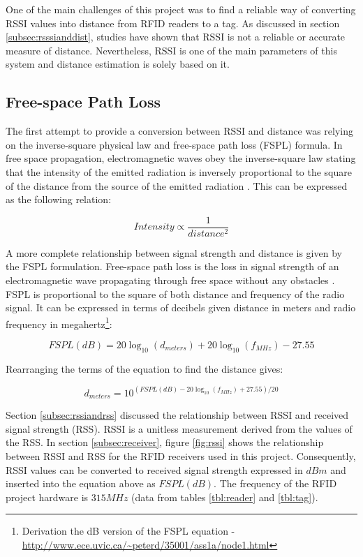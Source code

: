 One of the main challenges of this project was to find a reliable way of converting RSSI values into distance from RFID readers to a tag. As discussed in section \ref{subsec:rsssianddist}, studies have shown that RSSI is not a reliable or accurate measure of distance. Nevertheless, RSSI is one of the main parameters of this system and distance estimation is solely based on it.

\subsection{Free-space Path Loss}

The first attempt to provide a conversion between RSSI and distance was relying on the inverse-square physical law and free-space path loss (FSPL) formula. In free space propagation, electromagnetic waves obey the inverse-square law stating that the intensity of the emitted radiation is inversely proportional to the square of the distance from the source of the emitted radiation \cite[p. 19]{Schlaikjer1962}. This can be expressed as the following relation:

\[ Intensity \propto \frac{1}{distance^{2}} \]

A more complete relationship between signal strength and distance is given by the FSPL formulation. Free-space path loss is the loss in signal strength of an electromagnetic wave propagating through free space without any obstacles \cite{Balanis2012}. FSPL is proportional to the square of both distance and frequency of the radio signal. It can be expressed in terms of decibels given distance in meters and radio frequency in megahertz\footnote{Derivation the dB version of the FSPL equation - \url{http://www.ece.uvic.ca/~peterd/35001/ass1a/node1.html}}: 

\[ FSPL(dB) = 20\log_{10}(d_{meters}) + 20\log_{10}(f_{MHz}) - 27.55 \]
	
Rearranging the terms of the equation to find the distance gives:

\[ d_{meters} = 10^{(FSPL(dB) - 20\log_{10}(f_{MHz}) + 27.55) / 20} \]

Section \ref{subsec:rssiandrss} discussed the relationship between RSSI and received signal strength (RSS). RSSI is a unitless measurement derived from the values of the RSS. In section \ref{subsec:receiver}, figure \ref{fig:rssi} shows the relationship between RSSI and RSS for the RFID receivers used in this project. Consequently, RSSI values can be converted to received signal strength expressed in $dBm$ and inserted into the equation above as $FSPL(dB)$. The frequency of the RFID project hardware is  $315MHz$ (data from tables \ref{tbl:reader} and \ref{tbl:tag}).

